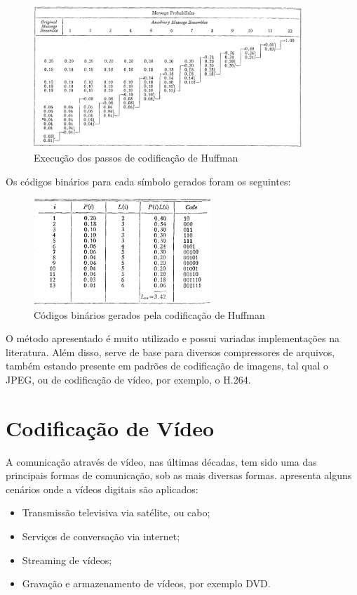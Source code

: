 \documentclass[cic,tc]{iiufrgs}
\begin{document}
\begin{figure}[H]
    \caption{Execução dos passos de codificação de Huffman}
    \begin{center}
        \includegraphics[width=0.9\textwidth]{img/huffmanprocess.png}
    \end{center}
\end{figure}

Os códigos binários para cada símbolo gerados foram os seguintes:
\begin{figure}[H]
    \caption{Códigos binários gerados pela codificação de Huffman}
    \begin{center}
        \includegraphics[width=0.6\textwidth]{img/huffmantable.png}
    \end{center}
\end{figure}

O método apresentado é muito utilizado e possui variadas implementações na 
literatura.
Além disso, serve de base para diversos compressores de arquivos, também 
estando presente em padrões de codificação de imagens, tal qual o JPEG, 
ou de codificação de vídeo, por exemplo, o H.264.

\section{Codificação de Vídeo}
\label{sec:codvideo}
A comunicação através de vídeo, nas últimas décadas, tem sido uma das principais formas
de comunicação, sob as mais diversas formas.
\citet{SullivanH264} apresenta alguns cenários onde a vídeos digitais são aplicados:
\begin{itemize}
    \item Transmissão televisiva via satélite, ou cabo;
    \item Serviços de conversação via internet;
    \item Streaming de vídeos;
    \item Gravação e armazenamento de vídeos, por exemplo DVD.
\end{itemize}
\end{document}
